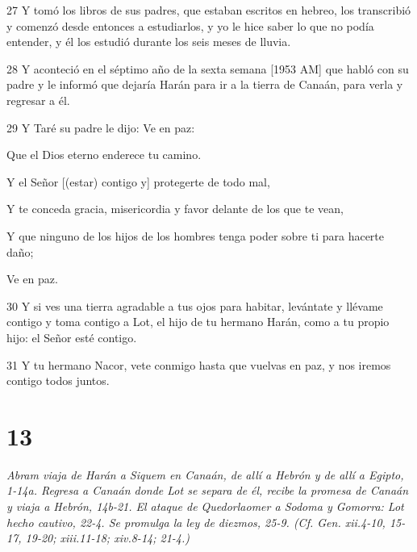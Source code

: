 \par 27 Y tomó los libros de sus padres, que estaban escritos en hebreo, los transcribió y comenzó desde entonces a estudiarlos, y yo le hice saber lo que no podía entender, y él los estudió durante los seis meses de lluvia.
\par 28 Y aconteció en el séptimo año de la sexta semana [1953 AM] que habló con su padre y le informó que dejaría Harán para ir a la tierra de Canaán, para verla y regresar a él.
\par 29 Y Taré su padre le dijo: Ve en paz:
\par    
\par     Que el Dios eterno enderece tu camino.  
\par     Y el Señor [(estar) contigo y] protegerte de todo mal,  
\par     Y te conceda gracia, misericordia y favor delante de los que te vean,  
\par     Y que ninguno de los hijos de los hombres tenga poder sobre ti para hacerte daño;  
\par     Ve en paz.
\par    
\par 30 Y si ves una tierra agradable a tus ojos para habitar, levántate y llévame contigo y toma contigo a Lot, el hijo de tu hermano Harán, como a tu propio hijo: el Señor esté contigo.
\par 31 Y tu hermano Nacor, vete conmigo hasta que vuelvas en paz, y nos iremos contigo todos juntos.

\chapter{13}

\par \textit{Abram viaja de Harán a Siquem en Canaán, de allí a Hebrón y de allí a Egipto, 1-14a. Regresa a Canaán donde Lot se separa de él, recibe la promesa de Canaán y viaja a Hebrón, 14b-21. El ataque de Quedorlaomer a Sodoma y Gomorra: Lot hecho cautivo, 22-4. Se promulga la ley de diezmos, 25-9. (Cf. Gen. xii.4-10, 15-17, 19-20; xiii.11-18; xiv.8-14; 21-4.)}


